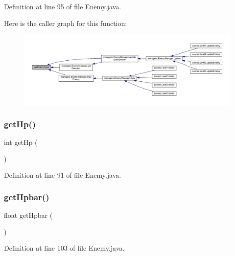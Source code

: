 Definition at line 95 of file Enemy.\+java.

Here is the caller graph for this function\+:
\nopagebreak
\begin{figure}[H]
\begin{center}
\leavevmode
\includegraphics[width=350pt]{classenemies_1_1_enemy_a40aced6dca930a3ae575a42b3286e230_icgraph}
\end{center}
\end{figure}
\mbox{\label{classenemies_1_1_enemy_a36ea7ddac664afde3e9f5e5f841855ee}} 
\subsubsection{\texorpdfstring{get\+Hp()}{getHp()}}
{\footnotesize\ttfamily int get\+Hp (\begin{DoxyParamCaption}{ }\end{DoxyParamCaption})}



Definition at line 91 of file Enemy.\+java.

\mbox{\label{classenemies_1_1_enemy_a719baea5da89286e1c263e1beb3ee35d}} 
\subsubsection{\texorpdfstring{get\+Hpbar()}{getHpbar()}}
{\footnotesize\ttfamily float get\+Hpbar (\begin{DoxyParamCaption}{ }\end{DoxyParamCaption})}



Definition at line 103 of file Enemy.\+java.

